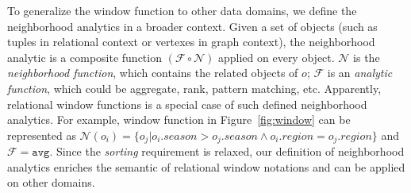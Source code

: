To generalize the window function to other data domains, we define the neighborhood
analytics in a broader context. Given a set of objects 
(such as tuples in relational context or vertexes in graph context),
the neighborhood analytic is a composite function
$(\mathcal{F} \circ \mathcal{N})$ applied on every object. $\mathcal{N}$
is the \emph{neighborhood function}, which contains the related objects of $o$;
$\mathcal{F}$ is an \emph{analytic function}, which could be aggregate, rank,
pattern matching, etc.
Apparently, relational window functions is a special case of such defined 
neighborhood analytics. For example, window function in Figure~\ref{fig:window} 
can be represented as $\mathcal{N}(o_i)=\{o_j | o_i.season > o_j.season \wedge o_i.region = o_j.region\}$
and $\mathcal{F} = \mathtt{avg}$.
Since the \emph{sorting} requirement is relaxed, our definition of neighborhood analytics
enriches the semantic of relational window notations 
and can be applied on other domains.